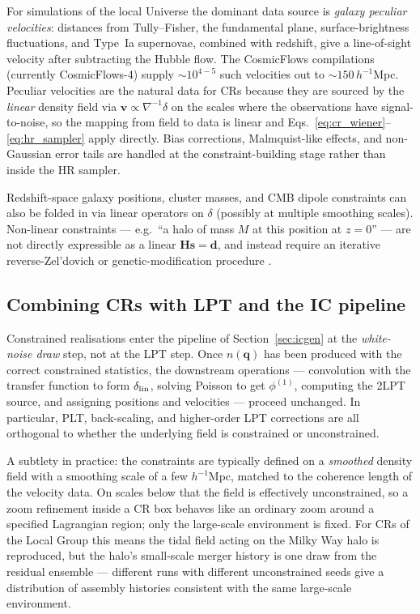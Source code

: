 \documentclass[12pt]{article}
\newcommand{\bq}{\mathbf{q}}
\newcommand{\bs}{\mathbf{s}}
\newcommand{\bd}{\mathbf{d}}
\newcommand{\bH}{\mathbf{H}}
\newcommand{\bv}{\mathbf{v}}
\begin{document}
For simulations of the local Universe the dominant data source is
\emph{galaxy peculiar velocities}: distances from Tully--Fisher, the
fundamental plane, surface-brightness fluctuations, and Type~Ia
supernovae, combined with redshift, give a line-of-sight velocity
after subtracting the Hubble flow.  The CosmicFlows compilations
(currently CosmicFlows-4) supply $\sim\!10^{4-5}$ such velocities out to
$\sim\!150\,h^{-1}$Mpc.  Peculiar velocities are the natural data for
CRs because they are sourced by the \emph{linear} density field via
$\bv\propto \nabla^{-1}\delta$ on the scales where the observations
have signal-to-noise, so the mapping from field to data is linear and
Eqs.~\eqref{eq:cr_wiener}--\eqref{eq:hr_sampler} apply directly.
Bias corrections, Malmquist-like effects, and non-Gaussian error tails
are handled at the constraint-building stage \citep{Sorce2018} rather
than inside the HR sampler.

Redshift-space galaxy positions, cluster masses, and CMB dipole
constraints can also be folded in via linear operators on $\delta$
(possibly at multiple smoothing scales).  Non-linear constraints ---
e.g.\ ``a halo of mass $M$ at this position at $z=0$'' --- are not
directly expressible as a linear $\bH\bs=\bd$, and instead require an
iterative reverse-Zel'dovich or genetic-modification procedure
\citep{Stopyra2021}.

\subsection{Combining CRs with LPT and the IC pipeline}
\label{sec:cr_pipeline}

Constrained realisations enter the pipeline of Section~\ref{sec:icgen}
at the \emph{white-noise draw} step, not at the LPT step.  Once
$n(\bq)$ has been produced with the correct constrained statistics, the
downstream operations --- convolution with the transfer function to
form $\delta_{\rm lin}$, solving Poisson to get $\phi^{(1)}$, computing
the 2LPT source, and assigning positions and velocities --- proceed
unchanged.  In particular, PLT, back-scaling, and higher-order LPT
corrections are all orthogonal to whether the underlying field is
constrained or unconstrained.

A subtlety in practice: the constraints are typically defined on a
\emph{smoothed} density field with a smoothing scale of a few $h^{-1}$Mpc,
matched to the coherence length of the velocity data.  On scales below
that the field is effectively unconstrained, so a zoom refinement inside
a CR box behaves like an ordinary zoom around a specified Lagrangian
region; only the large-scale environment is fixed.  For CRs of the
Local Group this means the tidal field acting on the Milky Way halo is
reproduced, but the halo's small-scale merger history is one draw from
the residual ensemble --- different runs with different unconstrained
seeds give a distribution of assembly histories consistent with the
same large-scale environment.
\end{document}
